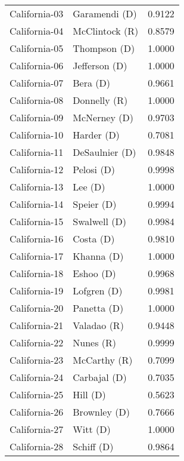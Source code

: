 \begin{longtable}{llr}
     California-03 &        Garamendi (D) &       0.9122 \\
     California-04 &       McClintock (R) &       0.8579 \\
     California-05 &         Thompson (D) &       1.0000 \\
     California-06 &        Jefferson (D) &       1.0000 \\
     California-07 &             Bera (D) &       0.9661 \\
     California-08 &         Donnelly (R) &       1.0000 \\
     California-09 &         McNerney (D) &       0.9703 \\
     California-10 &           Harder (D) &       0.7081 \\
     California-11 &       DeSaulnier (D) &       0.9848 \\
     California-12 &           Pelosi (D) &       0.9998 \\
     California-13 &              Lee (D) &       1.0000 \\
     California-14 &           Speier (D) &       0.9994 \\
     California-15 &         Swalwell (D) &       0.9984 \\
     California-16 &            Costa (D) &       0.9810 \\
     California-17 &           Khanna (D) &       1.0000 \\
     California-18 &            Eshoo (D) &       0.9968 \\
     California-19 &          Lofgren (D) &       0.9981 \\
     California-20 &          Panetta (D) &       1.0000 \\
     California-21 &          Valadao (R) &       0.9448 \\
     California-22 &            Nunes (R) &       0.9999 \\
     California-23 &         McCarthy (R) &       0.7099 \\
     California-24 &         Carbajal (D) &       0.7035 \\
     California-25 &             Hill (D) &       0.5623 \\
     California-26 &         Brownley (D) &       0.7666 \\
     California-27 &             Witt (D) &       1.0000 \\
     California-28 &           Schiff (D) &       0.9864 \\

\end{longtable}
